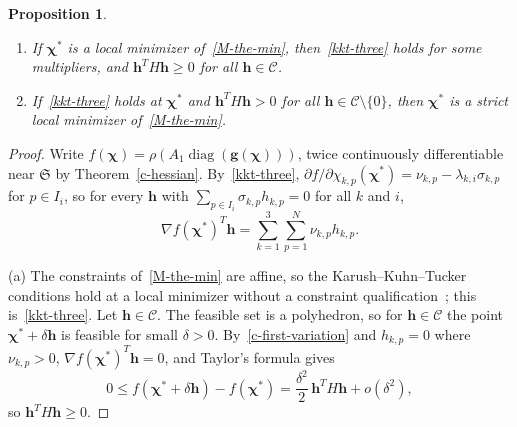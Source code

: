 \documentclass[11pt]{article}
\theoremstyle{plain}
\newtheorem{proposition}[theorem]{Proposition}
\theoremstyle{remark}
\numberwithin{equation}{section}
\begin{document}
\begin{proposition}\label{c-second-order}
\begin{enumerate}
\renewcommand{\labelenumi}{(\alph{enumi})}
\item If $\bm\chi^*$ is a local minimizer of~\eqref{M-the-min},
then~\eqref{kkt-three} holds for some multipliers, and
$\bm h^TH\bm h\ge 0$ for all $\bm h\in\mathcal{C}$.
\item If~\eqref{kkt-three} holds at $\bm\chi^*$ and
$\bm h^TH\bm h>0$ for all $\bm h\in\mathcal{C}\setminus\{0\}$, then
$\bm\chi^*$ is a strict local minimizer of~\eqref{M-the-min}.
\end{enumerate}
\end{proposition}
\begin{proof}
Write $f(\bm\chi)=\rho\left(A_1\operatorname{diag}\left(\bm g(\bm\chi)\right)\right)$,
twice continuously differentiable near $\mathfrak{S}$ by Theorem~\ref{c-hessian}.
By~\eqref{kkt-three},
$\partial f/\partial\chi_{k,p}(\bm\chi^*)=\nu_{k,p}-\lambda_{k,i}\sigma_{k,p}$
for $p\in I_i$, so for every $\bm h$ with
$\sum_{p\in I_i}\sigma_{k,p}h_{k,p}=0$ for all $k$ and $i$,
\begin{equation}\label{c-first-variation}
\nabla f(\bm\chi^*)^T\bm h=\sum_{k=1}^3\sum_{p=1}^N\nu_{k,p}h_{k,p} .
\end{equation}

(a) The constraints of~\eqref{M-the-min} are affine, so the
Karush--Kuhn--Tucker conditions hold at a local minimizer without a
constraint qualification~\cite[Section 5.5.3]{2004Boyd_Vandenberghe}; this
is~\eqref{kkt-three}. Let $\bm h\in\mathcal{C}$. The feasible set is a polyhedron, so for $\bm h\in\mathcal{C}$ the point $\bm\chi^*+\delta\bm h$ is feasible for small $\delta>0$.
By~\eqref{c-first-variation} and $h_{k,p}=0$ where $\nu_{k,p}>0$,
$\nabla f(\bm\chi^*)^T\bm h=0$, and Taylor's formula gives
\begin{equation*}
0\le f(\bm\chi^*+\delta\bm h)-f(\bm\chi^*)=\frac{\delta^2}{2}\,\bm h^TH\bm h+o\left(\delta^2\right),
\end{equation*}
so $\bm h^TH\bm h\ge 0$.


\end{proof}
\end{document}
